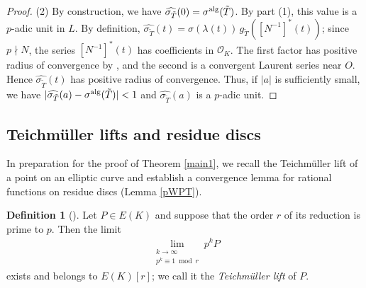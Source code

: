\documentclass[11pt]{amsart}
\theoremstyle{definition}
\newtheorem{dfn}[thm]{Definition}
\begin{document}
\begin{proof}
\medskip
\noindent\textup{(2)} By construction, we have $\widehat{\sigma_{\tilde{T}}}(0)=\sigma^{\rm alg}(\tilde{T})$. By part (1), this value is a $p$-adic unit in $L$. 
By definition, $\widehat{\sigma_{\tilde{T}}}(t)=\sigma(\lambda(t))\,g_{\tilde{T}}([N^{-1}]^{\ast}(t))$; since $p \nmid N$, the series $[N^{-1}]^{\ast}(t)$ has coefficients in $\mathcal{O}_K$.
The first factor has positive radius of convergence by \cite{BKY17}, and the second is a convergent Laurent series near $O$. Hence $\widehat{\sigma_{\tilde{T}}}(t)$ has positive radius of convergence. 
Thus, if $|a|$ is sufficiently small, we have $|\widehat{\sigma_{\tilde{T}}}(a)-\sigma^{\rm alg}(\tilde{T})|<1$ and $\widehat{\sigma_{\tilde{T}}}(a)$ is a $p$-adic unit.
%
%
\end{proof}




\subsection{Teichm\"{u}ller lifts and residue discs}

In preparation for the proof of Theorem \ref{main1}, we recall the
Teichm\"{u}ller lift of a point on an elliptic curve and establish a
convergence lemma for rational functions on residue discs
(Lemma \ref{pWPT}).



\begin{dfn}[{\cite[Proposition 10]{Si05a}}]
Let $P \in E(K)$ and suppose that the order $r$ of its reduction is prime
to $p$. Then the limit
%
\begin{align*}
 \lim_{\substack {k \to \infty \\ p^k \equiv 1 \bmod r}} p^kP
\end{align*}
%
exists and belongs to $E(K)[r]$; we call it the
{\it Teichm\"{u}ller lift} of $P$.
\end{dfn}
\end{document}
